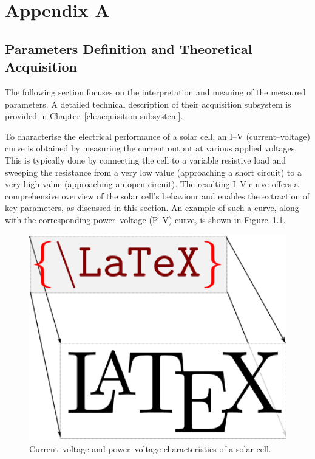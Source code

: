 \chapter{Appendix A}
\label{AppendixA}
\section{Parameters Definition and Theoretical Acquisition}


The following section focuses on the interpretation and meaning of the measured parameters. A detailed technical description of their acquisition subsystem is provided in Chapter~\ref{ch:acquisition-subsystem}.

To characterise the electrical performance of a solar cell, an I--V (current--voltage) curve is obtained by measuring the current output at various applied voltages. This is typically done by connecting the cell to a variable resistive load and sweeping the resistance from a very low value (approaching a short circuit) to a very high value (approaching an open circuit). The resulting I--V curve offers a comprehensive overview of the solar cell’s behaviour and enables the extraction of key parameters, as discussed in this section. An example of such a curve, along with the corresponding power--voltage (P--V) curve, is shown in Figure~\ref{fig:iv-pv}.

\begin{figure}[!htb]
    \centering
    \includegraphics[width=1\textwidth]{figures/drawing_example.png}
    \caption{Current--voltage and power--voltage characteristics of a solar cell.}
    \label{fig:iv-pv}
\end{figure}

